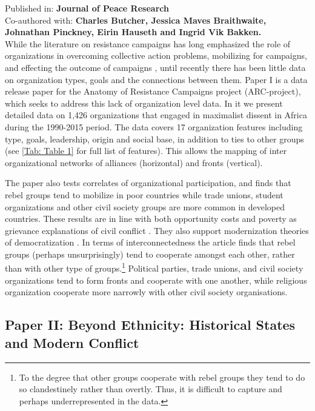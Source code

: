 Published in: \textbf{Journal of Peace Research}\\
Co-authored with: \textbf{Charles Butcher, Jessica Maves Braithwaite, Johnathan
Pinckney, Eirin Hauseth and Ingrid Vik Bakken.}\\

While the literature on resistance campaigns has long emphasized the role of
organizations in overcoming collective action problems, mobilizing for
campaigns, and effecting the outcome of campaigns \citep{Braithwaite2020,
	Brancati2016, Butcher_2014, Celestino_2013, chenoweth2011civil,
HaggardStephan2016DaD:, TarrowSidneyG.2011Pim:}, until recently there has been
little data on organization types, goals and the connections between them. Paper
I is a data release paper for the Anatomy of Resistance Campaigns project
(ARC-project), which seeks to address this lack of organization level data. In
it we present detailed data on 1,426 organizations that engaged in maximalist
dissent in Africa during the 1990-2015 period. The data covers 17 organization
features including type, goals, leadership, origin and social base, in addition
to ties to other groups (see \ref{Tab: Table 1} for full list of features). This
allows the mapping of inter organizational networks of alliances (horizontal) and
fronts (vertical).

The paper also tests correlates of organizational participation, and finds that
rebel groups tend to mobilize in poor countries while trade unions, student
organizations and other civil society groups are more common in developed
countries. These results are in line with both opportunity costs and poverty as
grievance explanations of civil conflict \citep{Collier2009, Davies_1962,
GurrTedRobert1970Wmr}. They also support modernization theories of
democratization \citep{Butcher_2014, Dahlum2019}. In terms of interconnectedness
the article finds that rebel groups (perhaps unsurprisingly) tend to cooperate
amongst each other, rather than with other type of groups.\footnote{To the
degree that other groups cooperate with rebel groups they tend to do so
clandestinely rather than overtly. Thus, it is difficult to capture and perhaps
underrepresented in the data.} Political parties, trade unions, and civil
society organizations tend to form fronts and cooperate with one another, while
religious organization cooperate more narrowly with other civil society
organisations.

\subsection{Paper II: Beyond Ethnicity: Historical States and Modern Conflict}
\label{Paper 2}

